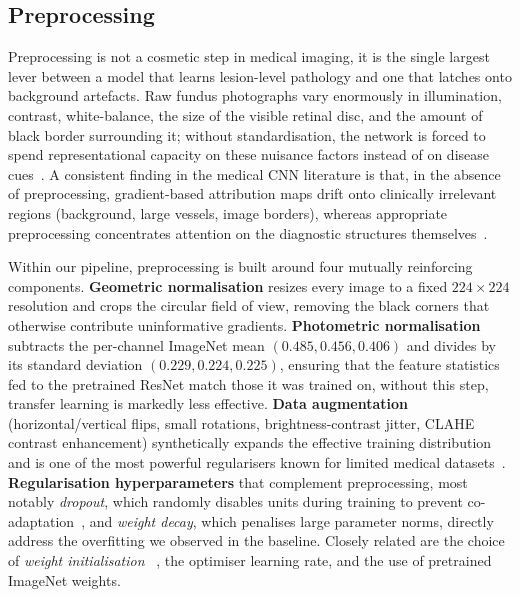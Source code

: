 \subsection{Preprocessing}
Preprocessing is not a cosmetic step in medical imaging, it is the single largest lever between a model that learns lesion-level pathology and one that latches onto background artefacts. Raw fundus photographs vary enormously in illumination, contrast, white-balance, the size of the visible retinal disc, and the amount of black border surrounding it; without standardisation, the network is forced to spend representational capacity on these nuisance factors instead of on disease cues~\cite{salehi2023preprocessing,litjens2017survey}. 
A consistent finding in the medical CNN literature is that, in the absence of preprocessing, gradient-based attribution maps drift onto clinically irrelevant regions (background, large vessels, image borders), whereas appropriate preprocessing concentrates attention on the diagnostic structures themselves~\cite{salehi2023preprocessing}.

Within our pipeline, preprocessing is built around four mutually reinforcing components. \textbf{Geometric normalisation} resizes every image to a fixed $224\times224$ resolution and crops the circular field of view, removing the black corners that otherwise contribute uninformative gradients. \textbf{Photometric normalisation} subtracts the per-channel ImageNet mean $(0.485,0.456,0.406)$ and divides by its standard deviation $(0.229,0.224,0.225)$, ensuring that the feature statistics fed to the pretrained ResNet match those it was trained on, without this step, transfer learning is markedly less effective. \textbf{Data augmentation} (horizontal/vertical flips, small rotations, brightness-contrast jitter, CLAHE contrast enhancement) synthetically expands the effective training distribution and is one of the most powerful regularisers known for limited medical datasets~\cite{shorten2019aug,perez2017aug}. 
\textbf{Regularisation hyperparameters} that complement preprocessing, most notably \emph{dropout}, which randomly disables units during training to prevent co-adaptation~\cite{srivastava2014dropout}, and \emph{weight decay}, which penalises large parameter norms, directly address the overfitting we observed in the baseline. Closely related are the choice of \emph{weight initialisation} ~\cite{he2015delving}, the optimiser learning rate, and the use of pretrained ImageNet weights.

